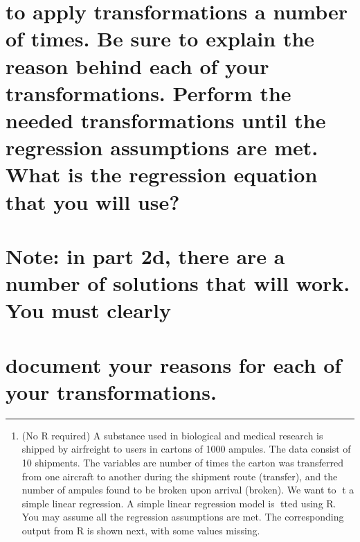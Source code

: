 \documentclass[
]{article}
\providecommand{\tightlist}{%
  \setlength{\itemsep}{0pt}\setlength{\parskip}{0pt}}
\begin{document}
\hypertarget{to-apply-transformations-a-number-of-times.-be-sure-to-explain-the-reason-behind-each-of-your-transformations.-perform-the-needed-transformations-until-the-regression-assumptions-are-met.-what-is-the-regression-equation-that-you-will-use}{%
\section{to apply transformations a number of times. Be sure to explain
the reason behind each of your transformations. Perform the needed
transformations until the regression assumptions are met. What is the
regression equation that you will
use?}\label{to-apply-transformations-a-number-of-times.-be-sure-to-explain-the-reason-behind-each-of-your-transformations.-perform-the-needed-transformations-until-the-regression-assumptions-are-met.-what-is-the-regression-equation-that-you-will-use}}

\hypertarget{section-1}{%
\section{}\label{section-1}}

\hypertarget{note-in-part-2d-there-are-a-number-of-solutions-that-will-work.-you-must-clearly}{%
\section{Note: in part 2d, there are a number of solutions that will
work. You must
clearly}\label{note-in-part-2d-there-are-a-number-of-solutions-that-will-work.-you-must-clearly}}

\hypertarget{document-your-reasons-for-each-of-your-transformations.}{%
\section{document your reasons for each of your
transformations.}\label{document-your-reasons-for-each-of-your-transformations.}}

\begin{center}\rule{0.5\linewidth}{0.5pt}\end{center}

\begin{enumerate}
\def\labelenumi{\arabic{enumi}.}
\setcounter{enumi}{2}
\tightlist
\item
  (No R required) A substance used in biological and medical research is
  shipped by airfreight to users in cartons of 1000 ampules. The data
  consist of 10 shipments. The variables are number of times the carton
  was transferred from one aircraft to another during the shipment route
  (transfer), and the number of ampules found to be broken upon arrival
  (broken). We want to t a simple linear regression. A simple linear
  regression model is tted using R. You may assume all the regression
  assumptions are met. The corresponding output from R is shown next,
  with some values missing.
\end{enumerate}
\end{document}
